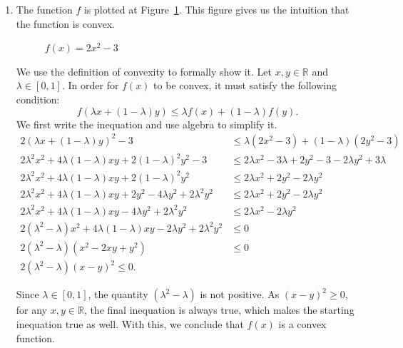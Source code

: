 
\begin{enumerate}
\item The function $f$ is plotted at Figure~\ref{fig:fctf}. This figure
gives us the intuition that the function is convex. 


  \begin{figure}[htb]
    \begin{center}
\caption{\label{fig:fctf}$f(x) = 2x^2 - 3$}
    \end{center}

  \end{figure}

  We use the
definition of convexity to formally show it. 
  Let $x, y \in \mathbb{R}$ and $\lambda \in [0,1]$. In order for $f(x)$ to be convex, it must satisfy the following condition:
	\[f(\lambda x + (1 - \lambda)y) \leq \lambda f(x) + (1-\lambda) f(y). \] 
We first write the inequation and use algebra to simplify it. 
\begin{align*}
	2(\lambda x + (1 - \lambda)y)^2 - 3  &\leq \lambda (2x^2 - 3)  + (1-\lambda) (2y^2 - 3) \\
	2\lambda^2 x^2 + 4\lambda(1 - \lambda)xy + 2(1-\lambda)^2 y^2 - 3 & \leq  2\lambda x^2 - 3\lambda + 2y^2 - 3  -2\lambda y^2 + 3\lambda\\
	2\lambda^2 x^2 + 4\lambda(1 - \lambda)xy + 2(1-\lambda)^2 y^2  &\leq 2\lambda x^2 + 2y^2 -2\lambda y^2 \\
	2\lambda^2 x^2 + 4\lambda(1 - \lambda)xy + 2y^2 -4\lambda y^2 + 2\lambda^2 y^2 & \leq 2\lambda x^2 + 2y^2 -2\lambda y^2 \\
	2\lambda^2 x^2 + 4\lambda(1 - \lambda)xy - 4\lambda y^2 + 2\lambda^2 y^2 & \leq 2\lambda x^2 -2\lambda y^2 \\
	2(\lambda^2 - \lambda) x^2 + 4\lambda(1 - \lambda)xy - 2\lambda y^2 + 2\lambda^2 y^2 & \leq  0 \\
	2(\lambda^2 - \lambda) (x^2 - 2xy + y^2) & \leq  0 \\
	2(\lambda^2 - \lambda) (x-y)^2  \leq  0.
\end{align*}

Since $\lambda \in [0,1]$, the quantity $(\lambda^2 - \lambda)$ is not
positive. As $(x-y)^2 \geq 0$, for any $x, y \in \mathbb{R}$, the final inequation is always true, which makes the starting inequation true as well. With this, we conclude that $f(x)$ is a convex function.


\end{enumerate}
